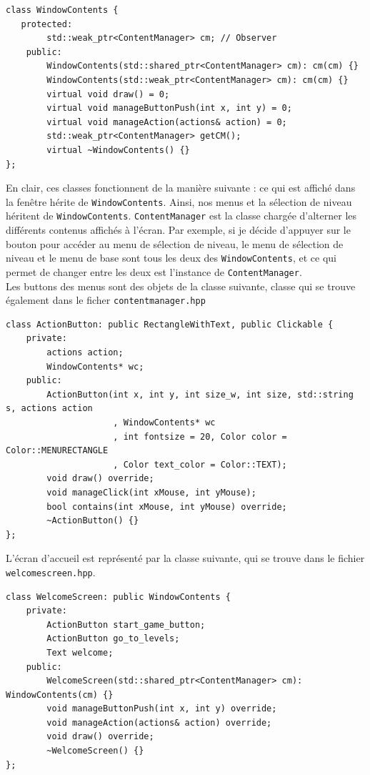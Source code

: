 \documentclass[a4paper, 12pt]{article}
\begin{document}
\begin{lstlisting}
class WindowContents {
   protected:
        std::weak_ptr<ContentManager> cm; // Observer
    public:
        WindowContents(std::shared_ptr<ContentManager> cm): cm(cm) {}
        WindowContents(std::weak_ptr<ContentManager> cm): cm(cm) {}
        virtual void draw() = 0;
        virtual void manageButtonPush(int x, int y) = 0;
        virtual void manageAction(actions& action) = 0;
        std::weak_ptr<ContentManager> getCM();
        virtual ~WindowContents() {}
};
\end{lstlisting}

\pagebreak

En clair, 
ces classes fonctionnent de la manière suivante : 
ce qui est affiché dans la fenêtre hérite de \texttt{WindowContents}. 
Ainsi, nos menus et la sélection de niveau héritent de \texttt{WindowContents}. 
\texttt{ContentManager} est la classe chargée d'alterner les différents contenus 
affichés à l'écran. 
Par exemple, si je décide d'appuyer sur le bouton pour accéder au menu de sélection 
de niveau, le menu de sélection de niveau et le menu de base sont tous les deux 
des \texttt{WindowContents}, 
et ce qui permet de changer entre les deux est l'instance de \texttt{ContentManager}.\\

Les buttons des menus sont des objets de la classe suivante, 
classe qui se trouve également dans le ficher \texttt{content\textunderscore manager.hpp}

\begin{lstlisting}
class ActionButton: public RectangleWithText, public Clickable {
    private:
        actions action;
        WindowContents* wc;
    public:
        ActionButton(int x, int y, int size_w, int size, std::string s, actions action
                     , WindowContents* wc
                     , int fontsize = 20, Color color = Color::MENURECTANGLE
                     , Color text_color = Color::TEXT);
        void draw() override;
        void manageClick(int xMouse, int yMouse);
        bool contains(int xMouse, int yMouse) override;
        ~ActionButton() {}
};
\end{lstlisting}

L'écran d'accueil est représenté par la classe suivante,
qui se trouve dans le fichier \texttt{welcome\textunderscore screen.hpp}.

\begin{lstlisting}
class WelcomeScreen: public WindowContents {
    private:
        ActionButton start_game_button;
        ActionButton go_to_levels;
        Text welcome;
    public:
        WelcomeScreen(std::shared_ptr<ContentManager> cm): WindowContents(cm) {}
        void manageButtonPush(int x, int y) override;
        void manageAction(actions& action) override;
        void draw() override;
        ~WelcomeScreen() {}
};
\end{lstlisting}
\end{document}
